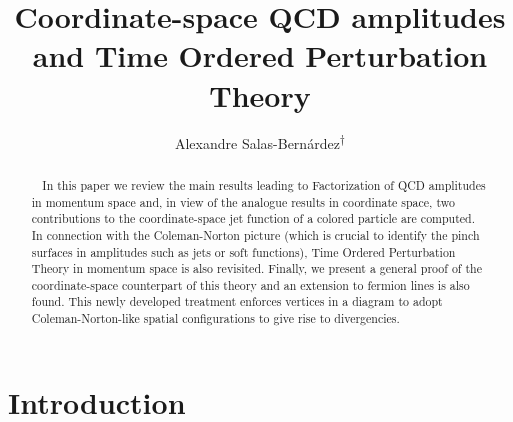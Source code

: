 \documentclass[%
 reprint,
 amsmath,amssymb,
 aps,
]{revtex4-1}
\begin{document}
\title{Coordinate-space QCD amplitudes and Time Ordered Perturbation Theory}
\author{Alexandre Salas-Bern\'ardez\textsuperscript{$\dagger$}}


\begin{abstract}
\centering
\begin{minipage}{\dimexpr\paperwidth-6.85cm}

  $\;\;$ In this paper we review the main results leading to Factorization of QCD amplitudes in momentum space and, in view of the analogue results in coordinate space, two contributions to the coordinate-space jet function of a colored particle are computed. In connection with the Coleman-Norton picture (which is crucial to identify the pinch surfaces in amplitudes such as jets or soft functions), Time Ordered Perturbation Theory in momentum space is also revisited. Finally, we present a general proof of the coordinate-space counterpart of this theory and an extension to fermion lines is also found. This newly developed treatment enforces vertices in a diagram to adopt Coleman-Norton-like spatial configurations to give rise to divergencies.
\end{minipage}
\end{abstract}


\maketitle

\section{Introduction}
\end{document}

